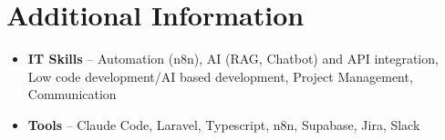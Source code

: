 \documentclass[a4paper,10pt]{article}
\begin{document}
\section{Additional Information}
\begin{itemize}
\item \textbf{IT Skills} -- Automation (n8n), AI (RAG, Chatbot) and API integration, Low code development/AI based development, Project Management, Communication
\item \textbf{Tools} -- Claude Code, Laravel, Typescript, n8n, Supabase, Jira, Slack
\end{itemize}
\end{document}
